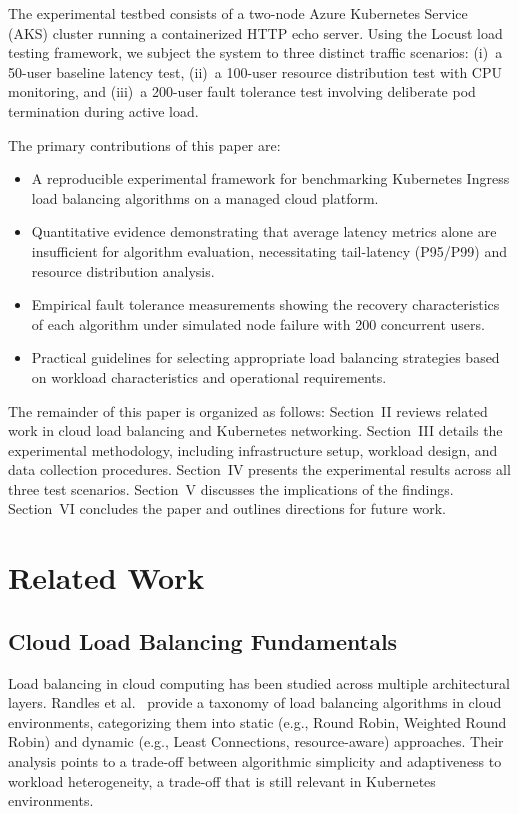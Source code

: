 \documentclass[conference]{IEEEtran}
\begin{document}
The experimental testbed consists of a two-node Azure Kubernetes Service (AKS) cluster running a containerized HTTP echo server. Using the Locust load testing framework, we subject the system to three distinct traffic scenarios: (i)~a 50-user baseline latency test, (ii)~a 100-user resource distribution test with CPU monitoring, and (iii)~a 200-user fault tolerance test involving deliberate pod termination during active load.

The primary contributions of this paper are:
\begin{itemize}
    \item A reproducible experimental framework for benchmarking Kubernetes Ingress load balancing algorithms on a managed cloud platform.
    \item Quantitative evidence demonstrating that average latency metrics alone are insufficient for algorithm evaluation, necessitating tail-latency (P95/P99) and resource distribution analysis.
    \item Empirical fault tolerance measurements showing the recovery characteristics of each algorithm under simulated node failure with 200 concurrent users.
    \item Practical guidelines for selecting appropriate load balancing strategies based on workload characteristics and operational requirements.
\end{itemize}

The remainder of this paper is organized as follows: Section~II reviews related work in cloud load balancing and Kubernetes networking. Section~III details the experimental methodology, including infrastructure setup, workload design, and data collection procedures. Section~IV presents the experimental results across all three test scenarios. Section~V discusses the implications of the findings. Section~VI concludes the paper and outlines directions for future work.


\section{Related Work}

\subsection{Cloud Load Balancing Fundamentals}
Load balancing in cloud computing has been studied across multiple architectural layers. Randles et al.~\cite{randles2010comparative} provide a taxonomy of load balancing algorithms in cloud environments, categorizing them into static (e.g., Round Robin, Weighted Round Robin) and dynamic (e.g., Least Connections, resource-aware) approaches. Their analysis points to a trade-off between algorithmic simplicity and adaptiveness to workload heterogeneity, a trade-off that is still relevant in Kubernetes environments.
\end{document}
